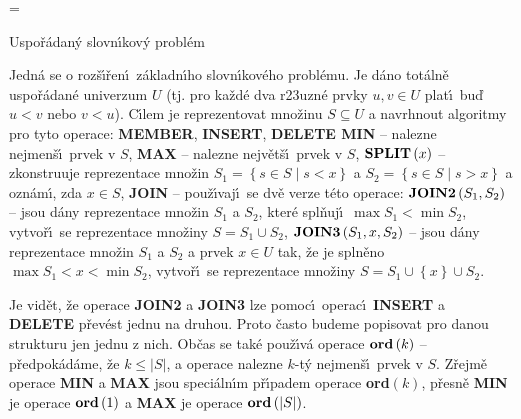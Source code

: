 



\magnification=
\NoPageNumbers
\nopagenumbers
\pagewidth{5.4in}


\def \emph#1{\underbar{#1}}
\def \Prob{\operatorname{Prob}}
\def \count{\operatorname{count}}
\def \NIL{\operatorname{NIL}}
\def \otec{\operatorname{otec}}
\def \list{\operatorname{list}}
\def \Prv{\operatorname{Prv}}
\def \Nasl{\operatorname{Nasl}}
\def \levy{\operatorname{levy}}
\def \pravy{\operatorname{pravy}}
\def \bratr{\operatorname{bratr}}
\def \Prst{\operatorname{Prst}}
\def \key{\operatorname{key}}
\def \hloubka{\operatorname{hloubka}}


\heading
Uspo\v r\'adan\'y slovn\'\i kov\'y probl\'em
\endheading

\flushpar Jedn\'a se o roz\v s\'\i\v ren\'\i\ z\'akladn\'\i ho slovn\'\i kov\'eho probl\'emu. Je 
d\'ano tot\'aln\v e uspo\v r\'adan\'e univerzum $U$ (tj. pro ka\v zd\'e dva 
r\accent23uzn\'e prvky $u,v\in U$ plat\'\i\ bu\v d $u<v$ nebo $v<
u$). C\'\i lem 
je reprezentovat 
mno\v zinu $S\subseteq U$ a navrhnout algoritmy pro tyto operace:\newline 
{\bf MEMBER}, {\bf INSERT}, {\bf DELETE\newline 
MIN} -- nalezne nejmen\v s\'\i\ prvek v $S$,\newline 
{\bf MAX} -- nalezne nejv\v et\v s\'\i\ prvek v $S$,\newline 
$\bold S\bold P\bold L\bold I\bold T\left(x\right)$ -- zkonstruuje reprezentace mno\v zin 
$S_1=\left\{s\in S\mid s<x\right\}$ a $S_2=\left\{s\in S\mid s>x\right\}$ a ozn\'am\'\i , zda 
$x\in S$,\newline 
{\bf JOIN} -- pou\v z\'\i vaj\'\i\ se dv\v e verze t\'eto operace:\newline 
$\bold J\bold O\bold I\bold N\bold 2\left(S_1,S_2\right)$ -- jsou d\'any reprezentace mno\v zin $
S_1$ a $S_2$, kter\'e 
spl\v nuj\'\i\ $\max S_1<\min S_2$, vytvo\v r\'\i\ se reprezentace mno\v ziny 
$S=S_1\cup S_2$,\newline 
$\bold J\bold O\bold I\bold N\bold 3\left(S_1,x,S_2\right)$ -- jsou d\'any reprezentace mno\v zin $
S_1$ a $S_2$ a 
prvek $x\in U$ tak, \v ze je spln\v eno $\max S_1<x<\min S_2$, vytvo\v r\'\i\ 
se reprezentace mno\v ziny $S=S_1\cup \left\{x\right\}\cup S_2$.
\smallskip

\flushpar Je vid\v et, \v ze operace {\bf JOIN2} a {\bf JOIN3} lze pomoc\'\i\ ope\-rac\'\i\ 
{\bf INSERT} a {\bf DELETE} p\v rev\'est jednu na druhou. Proto \v casto budeme 
popisovat pro danou strukturu jen jednu z nich. 
Ob\v cas se tak\'e pou\v z\'\i v\'a operace\newline 
$\bold o\bold r\bold d\left(k\right)$ -- p\v redpok\'ad\'ame, \v ze $k\le |S
|$, a operace nalezne $k$-t\'y 
nejmen\v s\'\i\ prvek v $S$.\newline 
Z\v rejm\v e operace {\bf MIN} a {\bf MAX} jsou speci\'aln\'\i m p\v r\'\i padem 
ope\-race {\bf ord$\left(k\right)$}, 
p\v resn\v e {\bf MIN} je operace $\bold o\bold r\bold d\left(1\right)$ a {\bf MAX} je operace $
\bold o\bold r\bold d\left(|S|\right)$.


